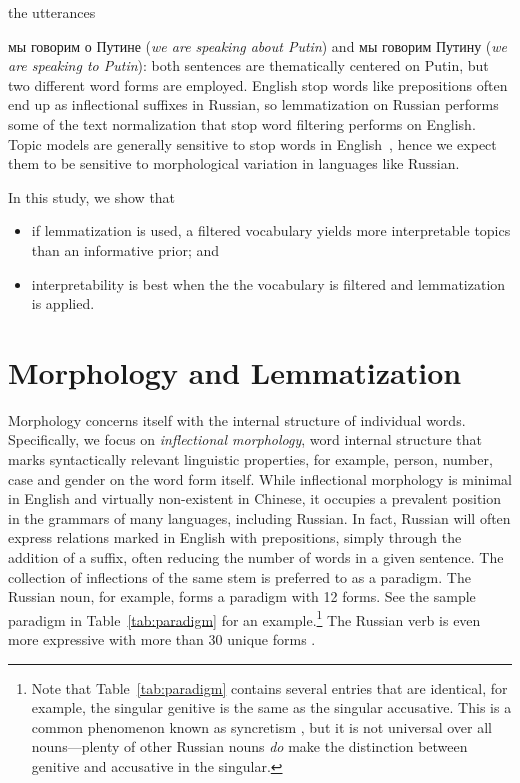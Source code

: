 \documentclass[11pt,letterpaper]{article}
\begin{document}
the utterances {{мы говорим о Путине} ({\em we
    are speaking about Putin}) and {{мы
      говорим Путину} ({\em we are speaking to Putin})}: both sentences
  are thematically centered on Putin, but two different word forms
  are employed.
English stop words like prepositions often end up as inflectional
suffixes in Russian, so lemmatization on Russian performs some
of the text normalization that stop word filtering performs on English.
Topic models are generally sensitive to stop
words in English~\cite{wallach2009,blei2010,eisenstein2011}, hence we
expect them to be sensitive to morphological variation in languages
like Russian.

In this study, we show that
\begin{itemize}
    \item if lemmatization is used, a filtered vocabulary yields more
        interpretable topics than an informative prior; and
    \item interpretability is best when the
        the vocabulary is filtered and lemmatization
        is applied.
\end{itemize}


\section{Morphology and Lemmatization}\label{sec:inflectional}

Morphology concerns itself with the internal structure of individual
words.  Specifically, we focus on {\em inflectional morphology}, word
internal structure that marks syntactically relevant linguistic
properties, for example, person, number, case and gender on the word form
itself. While inflectional morphology is minimal in English and
virtually non-existent in Chinese, it occupies a prevalent position in
the grammars of many languages, including Russian. In fact, Russian will often
express relations marked in English with prepositions, simply through
the addition of a suffix, often reducing the number of words in a
given sentence. The collection of inflections of the same stem is preferred to as a
paradigm.  The Russian noun, for example, forms a paradigm with 12
forms.  See the sample paradigm in Table~\ref{tab:paradigm} for an
example.\footnote{
    Note that Table~\ref{tab:paradigm} contains several
  entries that are identical, for example, the singular genitive is the same
  as the singular accusative. This is a common phenomenon known as
  syncretism \cite{baerman2005syntax}, but it is not universal over all nouns---plenty of other
  Russian nouns {\em do} make the distinction between
  genitive and accusative in the singular.
}
The Russian verb is even more expressive with more
than 30 unique forms \cite{wade2010comprehensive}.

}
\end{document}
